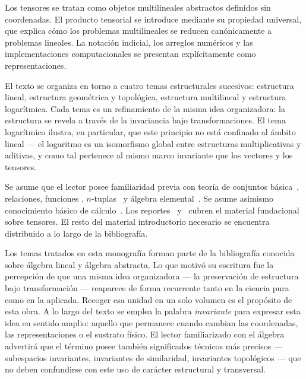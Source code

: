 \documentclass[12pt,openany]{book}
\theoremstyle{definition}
\begin{document}
\medskip

Los tensores se tratan como objetos multilineales abstractos definidos sin
coordenadas.
El producto tensorial se introduce mediante su propiedad universal, que explica
cómo los problemas multilineales se reducen canónicamente a problemas lineales.
La notación indicial, los arreglos numéricos y las implementaciones
computacionales se presentan explícitamente como representaciones.

\medskip

El texto se organiza en torno a cuatro temas estructurales sucesivos:
estructura lineal, estructura geométrica y topológica, estructura multilineal
y estructura logarítmica.
Cada tema es un refinamiento de la misma idea organizadora: la estructura se
revela a través de la invariancia bajo transformaciones.
El tema logarítmico ilustra, en particular, que este principio no está
confinado al ámbito lineal --- el logaritmo es un isomorfismo global entre
estructuras multiplicativas y aditivas, y como tal pertenece al mismo marco
invariante que los vectores y los tensores.

\medskip

Se asume que el lector posee familiaridad previa con teoría de conjuntos
básica~\cite{wilder}\cite{cohen}\cite{apostol}, relaciones, funciones
\cite{apostol}, $n$-tuplas~\cite{iribarren}\cite{cohen} y álgebra
elemental~\cite{iribarren}.
Se asume asimismo conocimiento básico de cálculo~\cite{apostol}.
Los reportes~\cite{kolecki} y~\cite{kolecki2} cubren el material fundacional
sobre tensores.
El resto del material introductorio necesario se encuentra distribuido a lo
largo de la bibliografía.

\medskip

Los temas tratados en esta monografía forman parte de la bibliografía
conocida sobre álgebra lineal y álgebra abstracta.
Lo que motivó su escritura fue la percepción de que una misma idea organizadora --- la
preservación de estructura bajo transformación --- reaparece de forma
recurrente tanto en la ciencia pura como en la aplicada.
Recoger esa unidad en un solo volumen es el propósito de esta obra.
A lo largo del texto se emplea la palabra \textit{invariante} para expresar
esta idea en sentido amplio: aquello que permanece cuando cambian las
coordenadas, las representaciones o el sustrato físico.
El lector familiarizado con el álgebra advertirá que el término posee también
significados técnicos más precisos --- subespacios invariantes, invariantes de
similaridad, invariantes topológicos --- que no deben confundirse con este uso
de carácter estructural y transversal.
\end{document}
